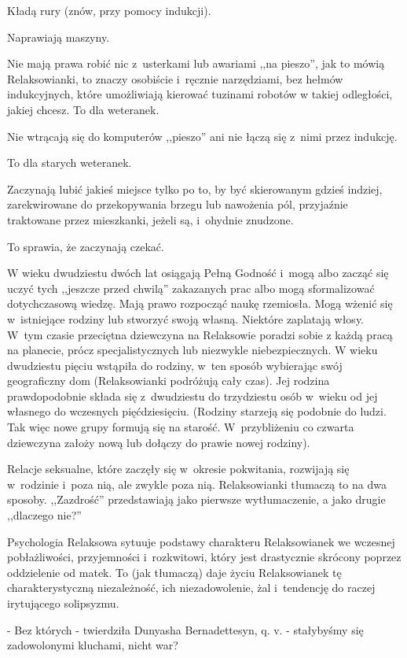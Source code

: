 \documentclass[oneside,polish,12pt,sfheadings]{mwbk}
\begin{document}
Kładą rury (znów, przy pomocy indukcji).

Naprawiają maszyny.

Nie mają prawa robić nic z~usterkami lub awariami ,,na pieszo'', jak
to mówią Relaksowianki, to znaczy osobiście i~ręcznie narzędziami,
bez hełmów indukcyjnych, które umożliwiają kierować tuzinami robotów
w takiej odległości, jakiej chcesz. To dla weteranek.

Nie wtrącają się do komputerów ,,pieszo'' ani nie łączą się z~nimi
przez indukcję.

To dla starych weteranek.

Zaczynają lubić jakieś miejsce tylko po to, by być skierowanym gdzieś
indziej, zarekwirowane do przekopywania brzegu lub nawożenia pól,
przyjaźnie traktowane przez mieszkanki, jeżeli są, i~ohydnie znudzone.

To sprawia, że zaczynają czekać.

W wieku dwudziestu dwóch lat osiągają Pełną Godność i~mogą albo zacząć
się uczyć tych ,,jeszcze przed chwilą'' zakazanych prac albo mogą sformalizować
dotychczasową wiedzę. Mają prawo rozpocząć naukę rzemiosła. Mogą wżenić
się w~istniejące rodziny lub stworzyć swoją własną. Niektóre zaplatają
włosy. W~tym czasie przeciętna dziewczyna na Relaksowie poradzi sobie
z każdą pracą na planecie, prócz specjalistycznych lub niezwykle niebezpiecznych.
W wieku dwudziestu pięciu wstąpiła do rodziny, w~ten sposób wybierając
swój geograficzny dom (Relaksowianki podróżują cały czas). Jej rodzina
prawdopodobnie składa się z~dwudziestu do trzydziestu osób w~wieku
od jej własnego do wczesnych pięćdziesięciu. (Rodziny starzeją się
podobnie do ludzi. Tak więc nowe grupy formują się na starość. W~przybliżeniu
co czwarta dziewczyna założy nową lub dołączy do prawie nowej rodziny).

Relacje seksualne, które zaczęły się w~okresie pokwitania, rozwijają
się w~rodzinie i~poza nią, ale zwykle poza nią. Relaksowianki tłumaczą
to na dwa sposoby. ,,Zazdrość'' przedstawiają jako pierwsze wytłumaczenie,
a jako drugie ,,dlaczego nie?''

Psychologia Relaksowa sytuuje podstawy charakteru Relaksowianek we
wczesnej pobłażliwości, przyjemności i~rozkwitowi, który jest drastycznie
skrócony poprzez oddzielenie od matek. To (jak tłumaczą) daje życiu
Relaksowianek tę charakterystyczną niezależność, ich niezadowolenie,
żal i~tendencję do raczej irytującego solipsyzmu.

- Bez których - twierdziła Dunyasha Bernadettesyn, q. v. - stałybyśmy
się zadowolonymi kluchami, nicht war?
\end{document}
